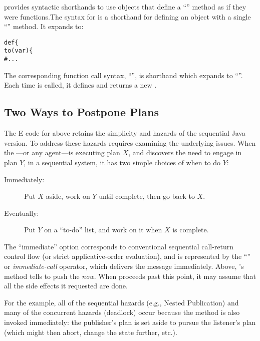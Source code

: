 \documentclass{llncs}
\begin{document}
 provides syntactic shorthands to use objects that define a
``'' method as if they were functions.The syntax for
 is a shorthand for defining an object with a
single ``'' method. It expands to:
%
\begin{alltt}
    def  \{
        to (var ) \{
            # ...
\end{alltt}
%
The corresponding function call syntax,
``'', is shorthand which expands to
``''. Each time  is
called, it defines and returns a new .

\subsection{Two Ways to Postpone Plans}

The E code for  above retains the simplicity and
hazards of the sequential Java version.  To address these hazards
requires examining the underlying issues.  When the
---or any agent---is executing plan $X$, and
discovers the need to engage in plan $Y$, in a sequential system, it
has two simple choices of when to do $Y$:
%
\begin{description}

\item[Immediately:] Put $X$ aside, work on $Y$ until
complete, then go back to $X$.

\item[Eventually:] Put $Y$ on a ``to-do'' list, and work on it
when $X$ is complete.

\end{description}
%
The ``immediate'' option corresponds to conventional sequential
call-return control flow (or strict applicative-order evaluation), and
is represented by the ``'' or \emph{immediate-call} operator,
which delivers the message immediately. Above, 's
 method tells  to push the
 \emph{now}. When  proceeds past
this point, it may assume that all the side effects it requested are
done.

For the  example, all of the sequential hazards
(e.g., Nested Publication) and many of the concurrent hazards
(deadlock) occur because the  method is also
invoked immediately: the publisher's plan is set aside to pursue the
listener's plan (which might then abort, change the state further,
etc.).
\end{document}
